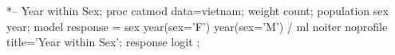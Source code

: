 \begin{listing}
*-- Year within Sex;
proc catmod data=vietnam;
   weight count;
   population sex year;
   model response = sex  year(sex='F')  year(sex='M')
     / ml noiter noprofile title='Year within Sex';
   response logit ;
\end{listing}
